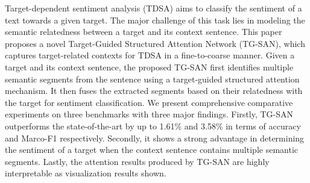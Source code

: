 Target-dependent sentiment analysis (TDSA) aims to classify the sentiment of a text towards a given target. The major challenge of this task lies in modeling the semantic relatedness between a target and its context sentence. This paper proposes a novel Target-Guided Structured Attention Network (TG-SAN), which captures target-related contexts for TDSA in a fine-to-coarse manner. Given a target and its context sentence, the proposed TG-SAN first identifies multiple semantic segments from the sentence using a target-guided structured attention mechanism. It then fuses the extracted segments based on their relatedness with the target for sentiment classification. We present comprehensive comparative experiments on three benchmarks with three major findings. Firstly, TG-SAN outperforms the state-of-the-art by up to 1.61\% and 3.58\% in terms of accuracy and Marco-F1 respectively. Secondly, it shows a strong advantage in determining the sentiment of a target when the context sentence contains multiple semantic segments. Lastly, the attention results produced by TG-SAN are highly interpretable as visualization results shown.